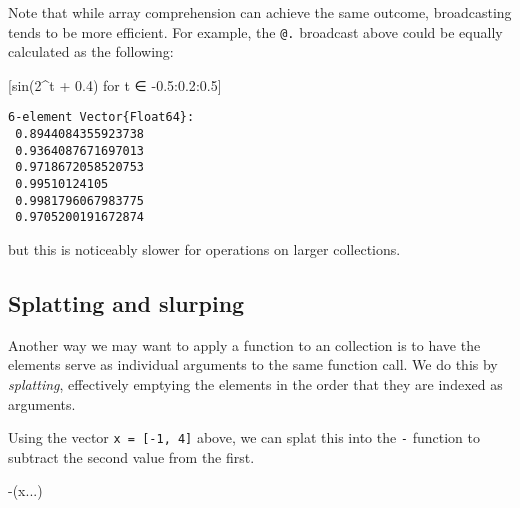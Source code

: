 \documentclass[
  letterpaper,
  DIV=11,
  numbers=noendperiod]{scrreprt}
\newenvironment{Shaded}{\begin{snugshade}}{\end{snugshade}}
\newcommand{\FloatTok}[1]{\textcolor[rgb]{0.68,0.00,0.00}{#1}}
\newcommand{\FunctionTok}[1]{\textcolor[rgb]{0.28,0.35,0.67}{#1}}
\newcommand{\NormalTok}[1]{\textcolor[rgb]{0.00,0.23,0.31}{#1}}
\newcommand{\OperatorTok}[1]{\textcolor[rgb]{0.37,0.37,0.37}{#1}}
\begin{document}
\begin{tcolorbox}[enhanced jigsaw, toprule=.15mm, opacitybacktitle=0.6, leftrule=.75mm, breakable, coltitle=black, bottomrule=.15mm, colbacktitle=quarto-callout-tip-color!10!white, bottomtitle=1mm, rightrule=.15mm, title=\textcolor{quarto-callout-tip-color}{\faLightbulb}\hspace{0.5em}{Convention}, colframe=quarto-callout-tip-color-frame, left=2mm, colback=white, opacityback=0, arc=.35mm, toptitle=1mm, titlerule=0mm]

Note that while array comprehension can achieve the same outcome,
broadcasting tends to be more efficient. For example, the \texttt{@.}
broadcast above could be equally calculated as the following:

\begin{Shaded}
\begin{Highlighting}[]
\NormalTok{[}\FunctionTok{sin}\NormalTok{(}\FloatTok{2}\OperatorTok{\^{}}\NormalTok{t }\OperatorTok{+} \FloatTok{0.4}\NormalTok{) for t }\OperatorTok{∈} \OperatorTok{{-}}\FloatTok{0.5}\OperatorTok{:}\FloatTok{0.2}\OperatorTok{:}\FloatTok{0.5}\NormalTok{]}
\end{Highlighting}
\end{Shaded}

\begin{verbatim}
6-element Vector{Float64}:
 0.8944084355923738
 0.9364087671697013
 0.9718672058520753
 0.99510124105
 0.9981796067983775
 0.9705200191672874
\end{verbatim}

but this is noticeably slower for operations on larger collections.

\end{tcolorbox}

\hypertarget{splatting-and-slurping}{%
\subsection{Splatting and slurping}\label{splatting-and-slurping}}

Another way we may want to apply a function to an collection is to have
the elements serve as individual arguments to the same function call. We
do this by \emph{splatting}, effectively emptying the elements in the
order that they are indexed as arguments.

Using the vector \texttt{x\ =\ {[}-1,\ 4{]}} above, we can splat this
into the \texttt{-} function to subtract the second value from the
first.

\begin{Shaded}
\begin{Highlighting}[]
\FunctionTok{{-}}\NormalTok{(x}\OperatorTok{...}\NormalTok{)}
\end{Highlighting}
\end{Shaded}
\end{document}

